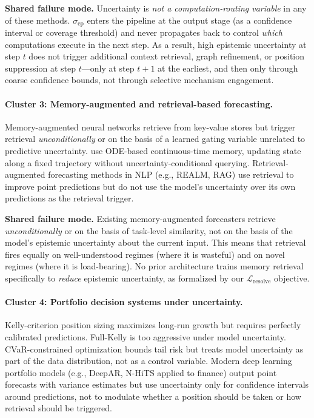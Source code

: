 \documentclass[11pt,a4paper]{article}
\newcommand{\sep}{\sigma_{\mathrm{ep}}}
\newcommand{\Lres}{\mathcal{L}_{\mathrm{resolve}}}
\begin{document}
\textbf{Shared failure mode.}
Uncertainty is \emph{not a computation-routing variable} in any of these
methods.  $\sep$ enters the pipeline at the output stage (as a confidence
interval or coverage threshold) and never propagates back to control
\emph{which} computations execute in the next step.  As a result, high
epistemic uncertainty at step $t$ does not trigger additional context
retrieval, graph refinement, or position suppression at step $t$—only at
step $t+1$ at the earliest, and then only through coarse confidence bounds,
not through selective mechanism engagement.

\paragraph{Cluster 3: Memory-augmented and retrieval-based forecasting.}
Memory-augmented neural networks \citep{graves2014neural} retrieve from
key-value stores but trigger retrieval \emph{unconditionally} or on the basis
of a learned gating variable unrelated to predictive uncertainty.
\citet{le2020neuralode} use ODE-based continuous-time memory, updating state
along a fixed trajectory without uncertainty-conditional querying.
Retrieval-augmented forecasting methods in NLP (e.g., REALM, RAG) use
retrieval to improve point predictions but do not use the model's uncertainty
over its own predictions as the retrieval trigger.

\textbf{Shared failure mode.}
Existing memory-augmented forecasters retrieve \emph{unconditionally} or
on the basis of task-level similarity, not on the basis of the model's
epistemic uncertainty about the current input.  This means that retrieval
fires equally on well-understood regimes (where it is wasteful) and on
novel regimes (where it is load-bearing).  No prior architecture trains
memory retrieval specifically to \emph{reduce} epistemic uncertainty,
as formalized by our $\Lres$ objective.

\paragraph{Cluster 4: Portfolio decision systems under uncertainty.}
Kelly-criterion position sizing \citep{kelly1956new} maximizes long-run growth
but requires perfectly calibrated predictions.  Full-Kelly is too aggressive
under model uncertainty.  CVaR-constrained optimization
\citep{rockafellar2000optimization} bounds tail risk but treats model
uncertainty as part of the data distribution, not as a control variable.
Modern deep learning portfolio models (e.g., DeepAR, N-HiTS applied to
finance) output point forecasts with variance estimates but use uncertainty
only for confidence intervals around predictions, not to modulate whether
a position should be taken or how retrieval should be triggered.
\end{document}
